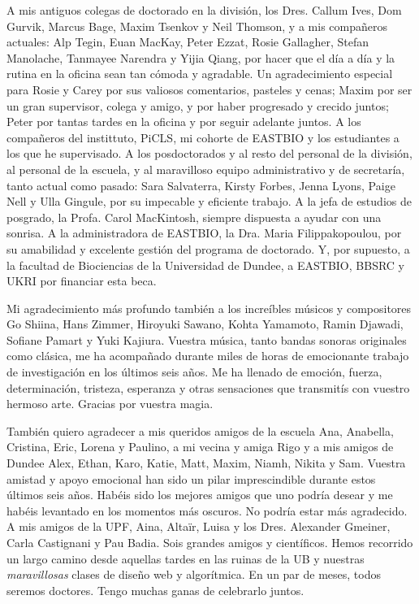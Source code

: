 A mis antiguos colegas de doctorado en la división, los Dres. Callum Ives, Dom Gurvik, Marcus Bage, Maxim Tsenkov y Neil Thomson, y a mis compañeros actuales: Alp Tegin, Euan MacKay, Peter Ezzat, Rosie Gallagher, Stefan Manolache, Tanmayee Narendra y Yijia Qiang, por hacer que el día a día y la rutina en la oficina sean tan cómoda y agradable. Un agradecimiento especial para Rosie y Carey por sus valiosos comentarios, pasteles y cenas; Maxim por ser un gran supervisor, colega y amigo, y por haber progresado y crecido juntos; Peter por tantas tardes en la oficina y por seguir adelante juntos. A los compañeros del instittuto, PiCLS, mi cohorte de EASTBIO y los estudiantes a los que he supervisado. A los posdoctorados y al resto del personal de la división, al personal de la escuela, y al maravilloso equipo administrativo y de secretaría, tanto actual como pasado: Sara Salvaterra, Kirsty Forbes, Jenna Lyons, Paige Nell y Ulla Gingule, por su impecable y eficiente trabajo. A la jefa de estudios de posgrado, la Profa. Carol MacKintosh, siempre dispuesta a ayudar con una sonrisa. A la administradora de EASTBIO, la Dra. Maria Filippakopoulou, por su amabilidad y excelente gestión del programa de doctorado. Y, por supuesto, a la facultad de Biociencias de la Universidad de Dundee, a EASTBIO, BBSRC y UKRI por financiar esta beca.

Mi agradecimiento más profundo también a los increíbles músicos y compositores Go Shiina, Hans Zimmer, Hiroyuki Sawano, Kohta Yamamoto, Ramin Djawadi, Sofiane Pamart y Yuki Kajiura. Vuestra música, tanto bandas sonoras originales como clásica, me ha acompañado durante miles de horas de emocionante trabajo de investigación en los últimos seis años. Me ha llenado de emoción, fuerza, determinación, tristeza, esperanza y otras sensaciones que transmitís con vuestro hermoso arte. Gracias por vuestra magia.

\newpage

También quiero agradecer a mis queridos amigos de la escuela Ana, Anabella, Cristina, Eric, Lorena y Paulino, a mi vecina y amiga Rigo y a mis amigos de Dundee Alex, Ethan, Karo, Katie, Matt, Maxim, Niamh, Nikita y Sam. Vuestra amistad y apoyo emocional han sido un pilar imprescindible durante estos últimos seis años. Habéis sido los mejores amigos que uno podría desear y me habéis levantado en los momentos más oscuros. No podría estar más agradecido. A mis amigos de la UPF, Aina, Altaïr, Luisa y los Dres. Alexander Gmeiner, Carla Castignani y Pau Badia. Sois grandes amigos y científicos. Hemos recorrido un largo camino desde aquellas tardes en las ruinas de la UB y nuestras \textit{maravillosas} clases de diseño web y algorítmica. En un par de meses, todos seremos doctores. Tengo muchas ganas de celebrarlo juntos.

